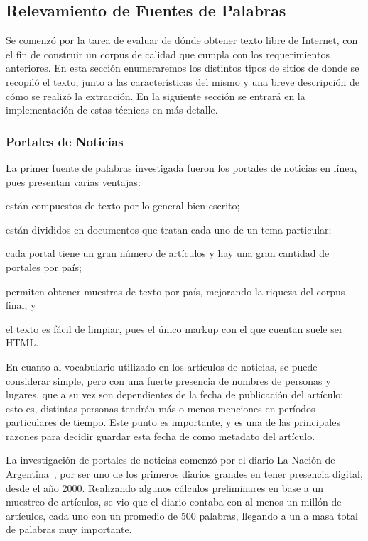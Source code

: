 \subsection{Relevamiento de Fuentes de Palabras}

Se comenzó por la tarea de evaluar de dónde obtener texto libre de Internet, con el fin de construir
un corpus de calidad que cumpla con los requerimientos anteriores. En esta sección enumeraremos los
distintos tipos de sitios de donde se recopiló el texto, junto a las características del mismo y una
breve descripción de cómo se realizó la extracción. En la siguiente sección se entrará en la
implementación de estas técnicas en más detalle.


\subsubsection{Portales de Noticias}

La primer fuente de palabras investigada fueron los portales de noticias en línea, pues presentan
varias ventajas:\begin{inparaenum}[(a)]
\item están compuestos de texto por lo general bien escrito;
\item están divididos en documentos que tratan cada uno de un tema particular;
\item cada portal tiene un gran número de artículos y hay una gran cantidad de portales por país;
\item permiten obtener muestras de texto por país, mejorando la riqueza del corpus final; y
\item el texto es fácil de limpiar, pues el único markup con el que cuentan suele ser HTML\@.
\end{inparaenum}

En cuanto al vocabulario utilizado en los artículos de noticias, se puede considerar simple, pero
con una fuerte presencia de nombres de personas y lugares, que a su vez son dependientes de la fecha
de publicación del artículo: esto es, distintas personas tendrán más o menos menciones en períodos
particulares de tiempo. Este punto es importante, y es una de las principales razones para decidir
guardar esta fecha de como metadato del artículo.


La investigación de portales de noticias comenzó por el diario La Nación de
Argentina~\cite{LaNacion}, por ser uno de los primeros diarios grandes en tener presencia digital,
desde el año 2000. Realizando algunos cálculos preliminares en base a un muestreo de artículos, se
vio que el diario contaba con al menos un millón de artículos, cada uno con un promedio de 500
palabras, llegando a un a masa total de palabras muy importante.

